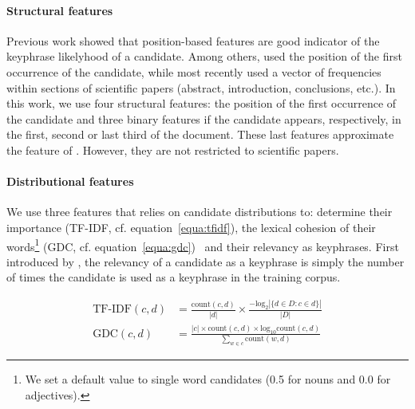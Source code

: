       \paragraph{Structural features} Previous work showed that position-based
      features are good indicator of the keyphrase likelyhood of a candidate.
      Among others,  used the position of the first
      occurrence of the candidate, while most recently
       used a vector of frequencies
      within sections of scientific papers (abstract, introduction, conclusions,
      etc.). In this work, we use four structural features: the position of the
      first occurrence of the candidate and three binary features if the
      candidate appears, respectively, in the first, second or last third of the
      document. These last features approximate the feature of
      . However, they are not restricted
      to scientific papers.

      \paragraph{Distributional features} We use three features that relies on
      candidate distributions to: determine their importance (TF-IDF, cf.
      equation~\ref{equa:tfidf}), the lexical cohesion of their
      words\footnote{We set a default value to single word candidates (0.5 for
      nouns and 0.0 for adjectives).} (GDC, cf.
      equation~\ref{equa:gdc})~\cite{lopez2010humb} and their relevancy as
      keyphrases. First introduced by , the
      relevancy of a candidate as a keyphrase is simply the number of times the
      candidate is used as a keyphrase in the training corpus.

      \vspace{-1em}

      \begin{footnotesize}
        \begin{align}
          \text{TF-IDF}(c, d) &= \frac{\text{count}(c, d)}{|d|}
          \times \frac{-\text{log}_2|\{d \in D : c \in d\}|}{|D|} \label{equa:tfidf}\\
          \text{GDC}(c, d) &= \frac{|c| \times \text{count}(c, d) \times \text{log}_{10}\text{count}(c, d)}{\sum_{w \in c}\text{count}(w, d)}\label{equa:gdc}
        \end{align}
      \end{footnotesize}

